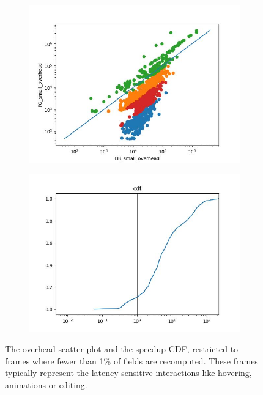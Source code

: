\begin{figure}
\begin{subfigure}{0.5\linewidth}
    \includegraphics[width=\linewidth]{DBPQSmallOverhead.jpg}
\end{subfigure}\hfill%
\begin{subfigure}{0.5\linewidth}
    \includegraphics[width=\linewidth]{DBPQSmallCDF.jpg}
\end{subfigure}
\caption{The overhead scatter plot and the speedup CDF,
  restricted to frames where fewer than 1\% of fields
  are recomputed.
  These frames typically represent the latency-sensitive
  interactions like hovering, animations or editing.}
\label{fig:dbpq-small}
\end{figure}

